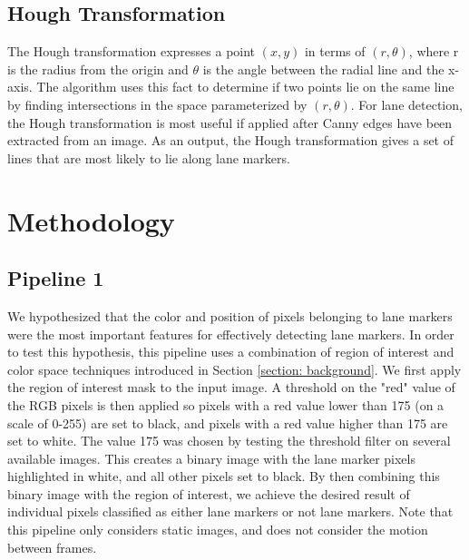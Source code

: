 \documentclass[conf]{new-aiaa}
\begin{document}
\subsection{Hough Transformation}
The Hough transformation expresses a point $(x,y)$ in terms of $(r, \theta)$, where r is the radius from the origin and $\theta$ is the angle between the radial line and the x-axis.  The algorithm uses this fact to determine if two points lie on the same line by finding intersections in the space parameterized by $(r, \theta)$.  For lane detection, the Hough transformation is most useful if applied after Canny edges have been extracted from an image.  As an output, the Hough transformation gives a set of lines that are most likely to lie along lane markers.

\section{Methodology}
\label{section: methodology}

\subsection{Pipeline 1}
We hypothesized that the color and position of pixels belonging to lane markers were the most important features for effectively detecting lane markers.  In order to test this hypothesis, this pipeline uses a combination of region of interest and color space techniques introduced in Section \ref{section: background}.  We first apply the region of interest mask to the input image.  A threshold on the "red" value of the RGB pixels is then applied so pixels with a red value lower than 175 (on a scale of 0-255) are set to black, and pixels with a red value higher than 175 are set to white.  The value 175 was chosen by testing the threshold filter on several available images.  This creates a binary image with the lane marker pixels highlighted in white, and all other pixels set to black.  By then combining this binary image with the region of interest, we achieve the desired result of individual pixels classified as either lane markers or not lane markers.  Note that this pipeline only considers static images, and does not consider the motion between frames.
\end{document}

